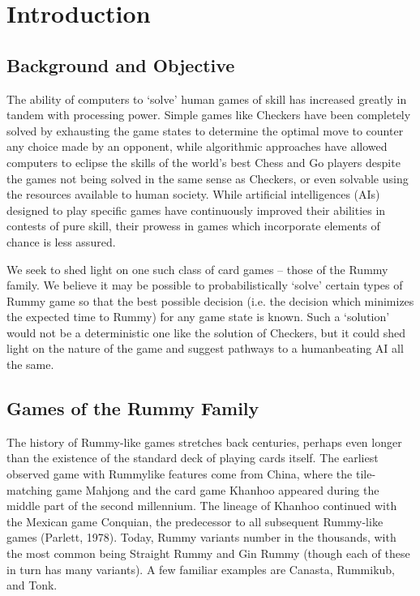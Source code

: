 \documentclass[letter,12pt]{article}
\begin{document}
\section{Introduction}

\subsection{Background and Objective}
The ability of computers to ‘solve’ human games of skill has increased greatly in tandem with processing power. Simple games like Checkers have been completely solved by exhausting the game states to determine the optimal move to counter any choice made by an opponent, while algorithmic approaches have allowed computers to eclipse the skills of the world’s best Chess and Go players despite the games not being solved in the same sense as Checkers, or even solvable using the resources available to human society. While artificial intelligences (AIs) designed to play specific games have continuously improved their abilities in contests of pure skill, their prowess in games which incorporate elements of chance is less assured.
 
We seek to shed light on one such class of card games – those of the Rummy family. We believe it may be possible to probabilistically ‘solve’ certain types of Rummy game so that the best possible decision (i.e. the decision which minimizes the expected time to Rummy) for any game state is known. Such a ‘solution’ would not be a deterministic one like the solution of Checkers, but it could shed light on the nature of the game and suggest pathways to a humanbeating AI all the same. 
 
\subsection{Games of the Rummy Family}

The history of Rummy-like games stretches back centuries, perhaps even longer than the existence of the standard deck of playing cards itself. The earliest observed game with Rummylike features come from China, where the tile-matching game Mahjong and the card game Khanhoo appeared during the middle part of the second millennium. The lineage of Khanhoo  continued with the Mexican game Conquian, the predecessor to all subsequent Rummy-like games (Parlett, 1978). Today, Rummy variants number in the thousands, with the most common being Straight Rummy and Gin Rummy (though each of these in turn has many variants). A few familiar examples are Canasta, Rummikub, and Tonk. \\
\end{document}
